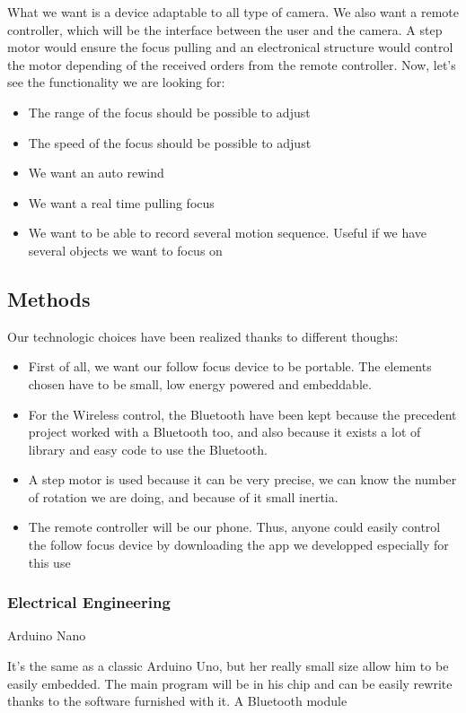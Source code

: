 \documentclass{sigchi}
\begin{document}
What we want is a device adaptable to all type of camera. We also want a remote controller, which will be the interface between the user and the camera. A step motor would ensure the focus pulling and an electronical structure would control the motor depending of the received orders from the remote controller.
Now, let’s see the functionality we are looking for:
\begin{itemize}
  \item The range of the focus should be possible to adjust
  \item The speed of the focus should be possible to adjust
  \item We want an auto rewind
  \item We want a real time pulling focus
  \item We want to be able to record several motion sequence. Useful if we have several objects we want to focus on
\end{itemize}

\subsection{Methods}
Our technologic choices have been realized thanks to different thoughs:
\begin{itemize}

\item First of all, we want our follow focus device to be portable. The elements chosen have to be small, low energy powered and embeddable.
\item For the Wireless control, the Bluetooth have been kept because the precedent project worked with a Bluetooth too, and also because it exists a lot of library and easy code to use the Bluetooth.
\item A step motor is used because it can be very precise, we can know the number of rotation we are doing, and because of it small inertia.
\item The remote controller will be our phone. Thus, anyone could easily control the follow focus device by downloading the app we developped especially for this use
\end{itemize}


\subsubsection{Electrical Engineering}

Arduino Nano
 
It’s the same as a classic Arduino Uno, but her really small size allow him to be easily embedded. The main program will be in his chip and can be easily rewrite thanks to the software furnished with it.
A Bluetooth module
 
\end{document}
